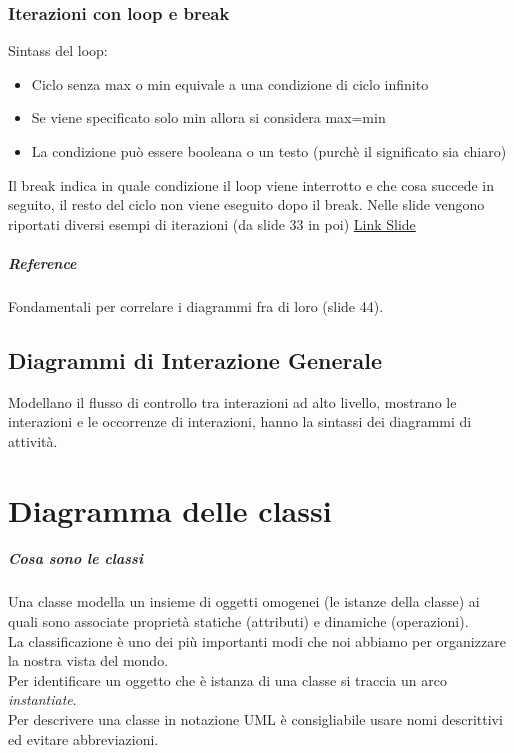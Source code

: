 \subsection*{Iterazioni con loop e break}
Sintass del loop:
\begin{itemize}
    \item Ciclo senza max o min equivale a una condizione di ciclo infinito
    \item Se viene specificato solo min allora si considera max=min
    \item La condizione può essere booleana o un testo (purchè il significato sia chiaro)
\end{itemize}
Il break indica in quale condizione il loop viene interrotto e che cosa succede in seguito,
il resto del ciclo non viene eseguito dopo il break.
Nelle slide vengono riportati diversi esempi di iterazioni (da slide 33 in poi) \href{https://elearning.unimib.it/pluginfile.php/1463483/mod_resource/content/2/10_Diagrammi%20di%20interazione.pdf}{Link Slide}
\paragraph*{Reference} Fondamentali per correlare i diagrammi fra di loro (slide 44).
\section{Diagrammi di Interazione Generale}
Modellano il flusso di controllo tra interazioni ad alto livello, mostrano le interazioni
e le occorrenze di interazioni, hanno la sintassi dei diagrammi di attività.

\chapter{Diagramma delle classi}
\paragraph*{Cosa sono le classi} Una classe modella un insieme di oggetti omogenei
(le istanze della classe) ai quali sono associate proprietà statiche (attributi) e 
dinamiche (operazioni).
\\ La classificazione è uno dei più importanti modi che noi abbiamo per organizzare la
nostra vista del mondo.
\\ Per identificare un oggetto che è istanza di una classe si traccia un arco
\textit{instantiate}.
\\ Per descrivere una classe in notazione UML è consigliabile usare nomi
descrittivi ed evitare abbreviazioni.
